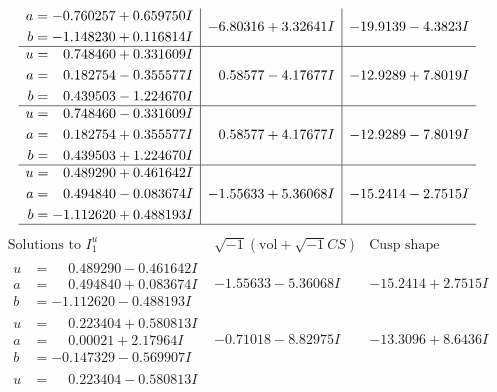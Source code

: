 \documentclass[1p]{elsarticle_modified}
\theoremstyle{definition}
\newcommand{\I}{\sqrt{-1}}
\begin{document}
$$\begin{array}{c|c|c}
\begin{aligned}
a &= -0.760257 + 0.659750 I \\
b &= -1.148230 + 0.116814 I\end{aligned}
 & -6.80316 + 3.32641 I & -19.9139 - 4.3823 I \\ \hline\begin{aligned}
u &= \phantom{-}0.748460 + 0.331609 I \\
a &= \phantom{-}0.182754 - 0.355577 I \\
b &= \phantom{-}0.439503 - 1.224670 I\end{aligned}
 & \phantom{-}0.58577 - 4.17677 I & -12.9289 + 7.8019 I \\ \hline\begin{aligned}
u &= \phantom{-}0.748460 - 0.331609 I \\
a &= \phantom{-}0.182754 + 0.355577 I \\
b &= \phantom{-}0.439503 + 1.224670 I\end{aligned}
 & \phantom{-}0.58577 + 4.17677 I & -12.9289 - 7.8019 I \\ \hline\begin{aligned}
u &= \phantom{-}0.489290 + 0.461642 I \\
a &= \phantom{-}0.494840 - 0.083674 I \\
b &= -1.112620 + 0.488193 I\end{aligned}
 & -1.55633 + 5.36068 I & -15.2414 - 2.7515 I\\
 \hline 
 \end{array}$$\newpage$$\begin{array}{c|c|c}  
\text{Solutions to }I^u_{1}& \I (\text{vol} + \sqrt{-1}CS) & \text{Cusp shape}\\
 \hline 
\begin{aligned}
u &= \phantom{-}0.489290 - 0.461642 I \\
a &= \phantom{-}0.494840 + 0.083674 I \\
b &= -1.112620 - 0.488193 I\end{aligned}
 & -1.55633 - 5.36068 I & -15.2414 + 2.7515 I \\ \hline\begin{aligned}
u &= \phantom{-}0.223404 + 0.580813 I \\
a &= \phantom{-}0.00021 + 2.17964 I \\
b &= -0.147329 - 0.569907 I\end{aligned}
 & -0.71018 - 8.82975 I & -13.3096 + 8.6436 I \\ \hline\begin{aligned}
u &= \phantom{-}0.223404 - 0.580813 I \\

\end{aligned}
\end{array}$$
\end{document}
